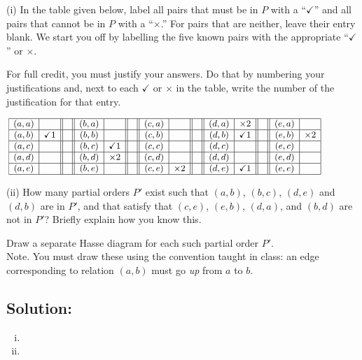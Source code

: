 \documentclass[12pt]{article}
\begin{document}
(i) In the table given below,  label all pairs that must be  in $P$ with a  ``$\checkmark$'' and all pairs that cannot be in $P$ with a  ``$\times$.''  For pairs that are neither,  leave their entry blank.  We start you off by labelling  the five  known pairs with the appropriate  ``$\checkmark$'' or $\times.$

\smallskip

For full credit, you must justify your answers.  Do that by numbering your justifications and,  next to each  $\checkmark$ or $\times$ in the table,  write the number of the justification for that entry.


\medskip

$$\small
\hspace*{-.5in}
\begin{array}{|c|c||c||c|c||c||c|c||c||c|c||c||c|c|}
\hline
(a,a) &  \quad & &(b,a) &    & &  (c,a)  & \quad &  & (d,a) & \times 2 &  &(e,a) & \quad \\\hline
(a,b) & \checkmark 1  & &(b,b) &   & &  (c,b)  &   &  & (d,b)  &  \checkmark  1&  &(e,b) & \times 2 \\\hline
(a,c) &   & &(b,c) &  \checkmark 1 & &  (c,c)  &  &  & (d,c) &  &  &(e,c) &   \\\hline
(a,d) &    & &(b,d) &  \times 2  & &  (c,d)  &   &  & (d,d) &  &  &(e,d) &     \\\hline
(a,e) &   & &(b,e) &    & &  (c,e)  & \times 2 &  & (d,e) & \checkmark 1 &  &(e,e) &   \\\hline
\end{array}
$$


\medskip

\bigskip

(ii) How many partial orders  $P'$  exist such that $(a,b)$, $(b, c)$, $(d,e)$ and $(d, b)$ are in $P'$, and that satisfy that  $(c,e)$, $(e,b)$, $(d,a)$, and $(b,d)$ are not in $P'$?
Briefly explain how you know this. 

Draw a separate Hasse diagram for each such partial order $P'.$\\
Note. You must  draw these using the convention  taught in class: an edge corresponding to relation $(a,b)$ must go {\em up} from $a$ to $b.$  


\bigskip

\subsection*{\textbf{Solution:}}
 \begin{enumerate} [(i)]
     \item 
     \item 
\end{enumerate}
\end{document}
